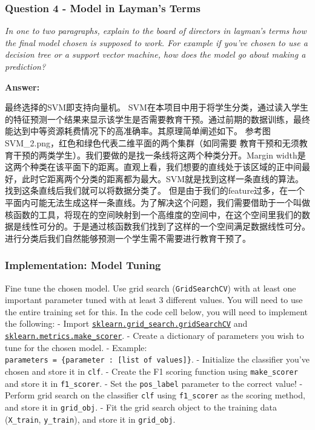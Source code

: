\documentclass{ctexart}
\begin{document}
    \subsubsection{Question 4 - Model in Layman's
Terms}\label{question-4---model-in-laymans-terms}

\emph{In one to two paragraphs, explain to the board of directors in
layman's terms how the final model chosen is supposed to work. For
example if you've chosen to use a decision tree or a support vector
machine, how does the model go about making a prediction?}

    \textbf{Answer: }

最终选择的SVM即支持向量机。
SVM在本项目中用于将学生分类，通过读入学生的特征预测一个结果来显示该学生是否需要教育干预。通过前期的数据训练，最终能达到中等资源耗费情况下的高准确率。其原理简单阐述如下。
参考图SVM\_2.png，红色和绿色代表二维平面的两个集群（如同需要
教育干预和无须教育干预的两类学生）。我们要做的是找一条线将这两个种类分开。Margin
width是这两个种类在该平面下的距离。直观上看，我们想要的直线处于该区域的正中间最好，此时它距离两个分类的距离都为最大。SVM就是找到这样一条直线的算法。找到这条直线后我们就可以将数据分类了。
但是由于我们的feature过多，在一个平面内可能无法生成这样一条直线。为了解决这个问题，我们需要借助于一个叫做核函数的工具，将现在的空间映射到一个高维度的空间中，在这个空间里我们的数据是线性可分的。于是通过核函数我们找到了这样的一个空间满足数据线性可分。进行分类后我们自然能够预测一个学生需不需要进行教育干预了。

    \subsubsection{Implementation: Model
Tuning}\label{implementation-model-tuning}

Fine tune the chosen model. Use grid search (\texttt{GridSearchCV}) with
at least one important parameter tuned with at least 3 different values.
You will need to use the entire training set for this. In the code cell
below, you will need to implement the following: - Import
\href{http://scikit-learn.org/stable/modules/generated/sklearn.grid_search.GridSearchCV.html}{\texttt{sklearn.grid\_search.gridSearchCV}}
and
\href{http://scikit-learn.org/stable/modules/generated/sklearn.metrics.make_scorer.html}{\texttt{sklearn.metrics.make\_scorer}}.
- Create a dictionary of parameters you wish to tune for the chosen
model. - Example:
\texttt{parameters\ =\ \{\textquotesingle{}parameter\textquotesingle{}\ :\ {[}list\ of\ values{]}\}}.
- Initialize the classifier you've chosen and store it in \texttt{clf}.
- Create the F1 scoring function using \texttt{make\_scorer} and store
it in \texttt{f1\_scorer}. - Set the \texttt{pos\_label} parameter to
the correct value! - Perform grid search on the classifier \texttt{clf}
using \texttt{f1\_scorer} as the scoring method, and store it in
\texttt{grid\_obj}. - Fit the grid search object to the training data
(\texttt{X\_train}, \texttt{y\_train}), and store it in
\texttt{grid\_obj}.
\end{document}
